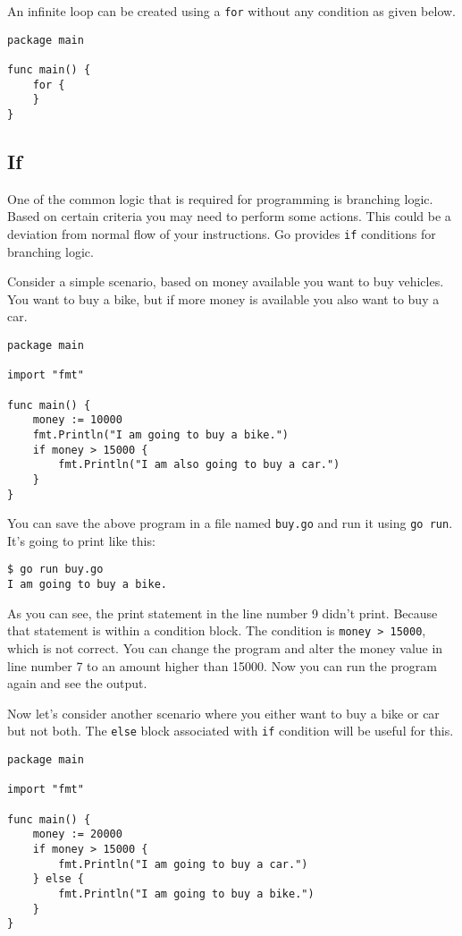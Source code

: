 An infinite loop can be created using a \texttt{for} without any
condition as given below.

\begin{lstlisting}[caption=Infinite For loop]
package main

func main() {
    for {
    }
}
\end{lstlisting}

\subsection{If}

One of the common logic that is required for programming is branching
logic.  Based on certain criteria you may need to perform some
actions.  This could be a deviation from normal flow of your
instructions.  Go provides \texttt{if} conditions for
branching logic.

Consider a simple scenario, based on money available you want to buy
vehicles.  You want to buy a bike, but if more money is available you
also want to buy a car.

\begin{lstlisting}[caption=If control structure (buy.go)]
package main

import "fmt"

func main() {
    money := 10000
    fmt.Println("I am going to buy a bike.")
    if money > 15000 {
        fmt.Println("I am also going to buy a car.")
    }
}
\end{lstlisting}

You can save the above program in a file named \texttt{buy.go} and run
it using \texttt{go run}.  It's going to print like this:

\begin{lstlisting}[numbers=none]
$ go run buy.go
I am going to buy a bike.
\end{lstlisting}

As you can see, the print statement in the line number 9 didn't print.
Because that statement is within a condition block.  The condition is
\texttt{money > 15000}, which is not correct.  You can change the program and
alter the money value in line number 7 to an amount higher than 15000.
Now you can run the program again and see the output.

Now let's consider another scenario where you either want to buy a
bike or car but not both.  The \texttt{else} block associated with
\texttt{if} condition will be useful for this.

\begin{lstlisting}[caption=If with else block]
package main

import "fmt"

func main() {
    money := 20000
    if money > 15000 {
        fmt.Println("I am going to buy a car.")
    } else {
        fmt.Println("I am going to buy a bike.")
    }
}
\end{lstlisting}

